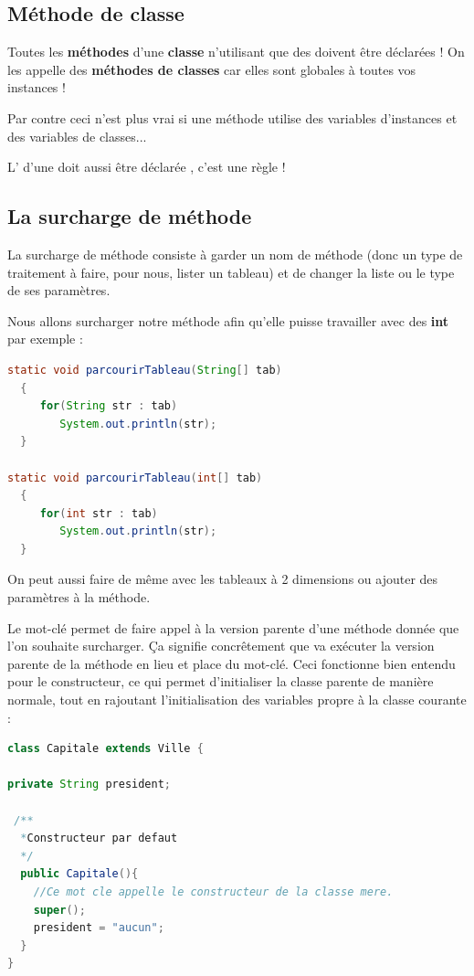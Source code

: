 \documentclass[a4paper,twoside]{article}
\begin{document}
\subsection{Méthode de classe}
Toutes les \textbf{méthodes} d'une \textbf{classe} n'utilisant que des  doivent être déclarées  ! On les appelle des \textbf{méthodes de classes} car elles sont globales à toutes vos instances !

\begin{remarque}
Par contre ceci n'est plus vrai si une méthode utilise des variables d'instances et des variables de classes...
\end{remarque}

L' d'une  doit aussi être déclarée , c'est une règle !

\subsection{La surcharge de méthode}\label{sec:surcharge}
La surcharge de méthode consiste à garder un nom de méthode (donc un type de traitement à faire, pour nous, lister un tableau) et de changer la liste ou le type de ses paramètres.

Nous allons surcharger notre méthode afin qu'elle puisse travailler avec des \textbf{int} par exemple :
\begin{lstlisting}[language=java]
static void parcourirTableau(String[] tab)
  {
     for(String str : tab)
        System.out.println(str);
  }
        
static void parcourirTableau(int[] tab)
  {
     for(int str : tab)
        System.out.println(str);
  }
\end{lstlisting}

On peut aussi faire de même avec les tableaux à 2 dimensions ou ajouter des paramètres à la méthode.

\bigskip

Le mot-clé  permet de faire appel à la version parente d'une méthode donnée que l'on souhaite surcharger. Ça signifie concrêtement que  va exécuter la version parente de la méthode en lieu et place du mot-clé. Ceci fonctionne bien entendu pour le constructeur, ce qui permet d'initialiser la classe parente de manière normale, tout en rajoutant l'initialisation des variables propre à la classe courante : 
\begin{lstlisting}[language=java]
class Capitale extends Ville {
 
private String president;
 
 /**
  *Constructeur par defaut
  */
  public Capitale(){
    //Ce mot cle appelle le constructeur de la classe mere.  
    super();
    president = "aucun";
  }
}
\end{lstlisting}
\end{document}

